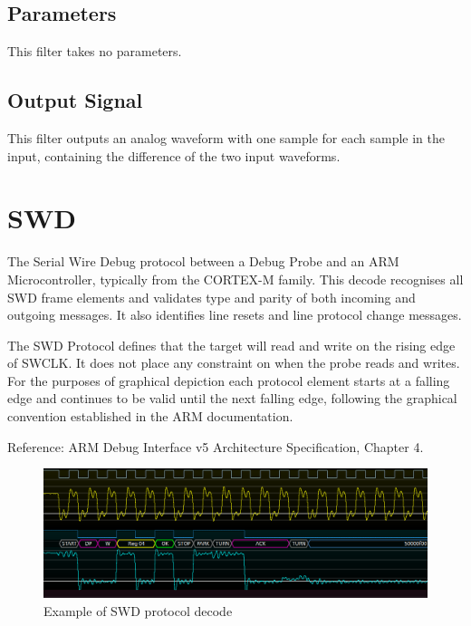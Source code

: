 \subsection{Parameters}

This filter takes no parameters.

\subsection{Output Signal}

This filter outputs an analog waveform with one sample for each sample in the input, containing the difference of the
two input waveforms.

\pagebreak
\section{SWD}

The Serial Wire Debug protocol between a Debug Probe and an ARM Microcontroller, typically from the CORTEX-M family. This
decode recognises all SWD frame elements and validates type and parity of both incoming and outgoing messages. It also
identifies line resets and line protocol change messages.

The SWD Protocol defines that the target will read and write on the rising edge of SWCLK. It does not place any constraint
on when the probe reads and writes. For the purposes of graphical depiction each protocol element starts at a falling edge
and continues to be valid until the next falling edge, following the graphical convention established in the ARM documentation.

Reference: ARM Debug Interface v5 Architecture Specification, Chapter 4.

\begin{figure}[h]
\centering
\includegraphics[width=16cm]{images/filters/swd.png}
\caption{Example of SWD protocol decode}
\label{filter_can}
\end{figure}

